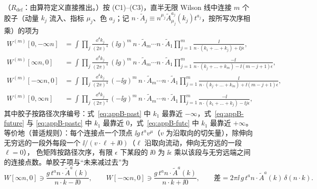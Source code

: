 \begin{proposition}\label{prop:appB-rules}
（$R_{\mathrm{def}}$：由算符定义直接推出。）按 (C1)--(C3)，直半无限 Wilson 线中连接 $m$ 个胶子（动量 $k_j$ 流入、指标 $\mu_j$、色 $a_j$；记 $n\cdot\tilde A_j\equiv n^{\mu_j}\tilde A^{a_j}_{\mu_j}(k_j)t^{a_j}$，按所写次序相乘）的项为
\begin{align}
W^{(m)}[0,-\infty n]&=\int\!\prod_j\frac{\dd^4k_j}{(2\pi)^4}\,(\ii g)^m\,n\cdot\tilde A_m\cdots n\cdot\tilde A_1\prod_{j=1}^m\frac{\ii}{n\cdot(k_1+\dots+k_j)+\ii j\epsilon},\label{eq:appB-past}\\
W^{(m)}[\infty n,0]&=\int\!\prod_j\frac{\dd^4k_j}{(2\pi)^4}\,(\ii g)^m\,n\cdot\tilde A_m\cdots n\cdot\tilde A_1\prod_{j=1}^m\frac{-\ii}{n\cdot(k_j+\dots+k_m)-\ii(m-j+1)\epsilon},\label{eq:appB-future}\\
W^{(m)}[-\infty n,0]&=\int\!\prod_j\frac{\dd^4k_j}{(2\pi)^4}\,(-\ii g)^m\,n\cdot\tilde A_m\cdots n\cdot\tilde A_1\prod_{j=1}^m\frac{\ii}{n\cdot(k_j+\dots+k_m)+\ii(m-j+1)\epsilon},\label{eq:appB-pastc}\\
W^{(m)}[0,\infty n]&=\int\!\prod_j\frac{\dd^4k_j}{(2\pi)^4}\,(-\ii g)^m\,n\cdot\tilde A_m\cdots n\cdot\tilde A_1\prod_{j=1}^m\frac{-\ii}{n\cdot(k_1+\dots+k_j)-\ii j\epsilon},\label{eq:appB-futc}
\end{align}
其中胶子按路径次序编号：式~\eqref{eq:appB-past} 中 $k_1$ 最靠近 $-\infty$，式~\eqref{eq:appB-future} 与 \eqref{eq:appB-pastc} 中 $k_1$ 最靠近 $0$，式~\eqref{eq:appB-futc} 中 $k_1$ 最靠近 $+\infty$。
等价地（普适规则）：每个连接点一个顶点 $\ii g\,t^av^\mu$（$v$ 为沿取向的切矢量），除伸向无穷远的一段外每段一个 $\ii/(v\cdot\ell+\ii0)$（$\ell$ 沿取向流动，伸向无穷远的一段 $\ell=0$），
色矩阵按路径次序，有限 $\epsilon$ 下某段的 $\ii0$ 为 $\ii\epsilon$ 乘以该段与无穷远端之间的连接点数。单胶子项与“未来减过去”为
\begin{equation}\label{eq:appB-onegluon}
W[\infty n,0]\ni\frac{g\,t^an\cdot\tilde A^a(k)}{n\cdot k-\ii0},\qquad W[-\infty n,0]\ni\frac{g\,t^an\cdot\tilde A^a(k)}{n\cdot k+\ii0},\qquad
\text{差}=2\pi\ii\,g\,t^an\cdot\tilde A^a(k)\,\delta(n\cdot k).
\end{equation}
\end{proposition}

